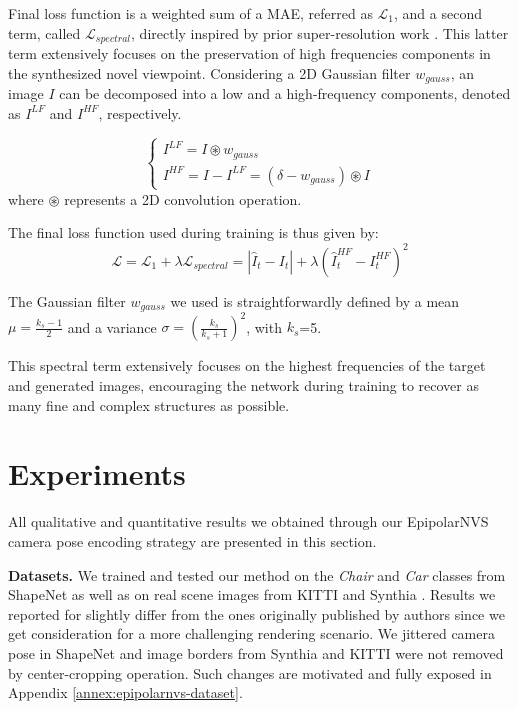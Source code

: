Final loss function is a weighted sum  of a \ac{MAE}, referred as $\mathcal{L}_{1}$, and a second term, called $\mathcal{L}_{spectral}$, directly inspired by prior super-resolution work \citep{fritsche2019frequency}. This latter term extensively focuses on the preservation of high frequencies components in the synthesized novel viewpoint. Considering a 2D Gaussian filter $w_{gauss}$, an image $I$ can be decomposed into a low and a high-frequency components, denoted as $I^{LF}$ and $I^{HF}$, respectively. 

\begin{equation}
\begin{cases}
     I^{LF}  = I\circledast w_{gauss} \\
     I^{HF} = I - I^{LF} = (\delta - w_{gauss})\circledast I
\end{cases}
\end{equation}
where $\circledast$ represents a 2D convolution operation. 

The final loss function used during training is thus given by: 
\begin{equation}
    \mathcal{L} = \mathcal{L}_{1} + \lambda \mathcal{L}_{spectral} = |\hat{I}_{t} - I_{t}| + \lambda \left( \hat{I}_{t}^{HF} - I_{t}^{HF} \right)^{2}
    \label{eq:1}
\end{equation}
 \newline

The Gaussian filter $w_{gauss}$ we used is straightforwardly defined by a mean $\mu = \frac{k_{s}-1}{2}$ and a variance $\sigma = (\frac{k_{s}}{k_{s}+1})^{2}$, with $k_{s}$=5.

This spectral term extensively focuses on the highest frequencies of the target and generated images, encouraging the network during training to recover as many fine and complex structures as possible.

\section{Experiments}
All qualitative and quantitative results we obtained through our EpipolarNVS camera pose encoding strategy are presented in this section. \newline

\noindent\textbf{Datasets.} We trained and tested our method on the \textit{Chair} and \textit{Car} classes from ShapeNet \citep{chang2015shapenet} as well as on real scene images from KITTI \citep{geiger2012we} and Synthia \citep{ros2016synthia}.
Results we reported for \citep{kim2020novel} slightly differ from the ones originally published by authors since we get consideration for a more challenging rendering scenario. We jittered camera pose in ShapeNet \citep{chang2015shapenet} and image borders from Synthia \citep{ros2016synthia} and KITTI \citep{geiger2012we} were not removed by center-cropping operation. Such changes are motivated and fully exposed in Appendix \ref{annex:epipolarnvs-dataset}.  \newline


